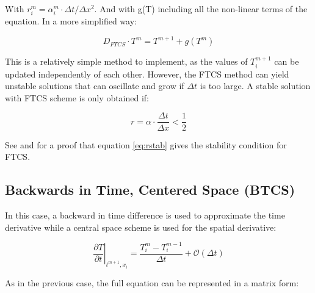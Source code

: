 With $r^m_i = \alpha^m_i \cdot \Delta t/ \Delta x^2$. And with g(T) including all the non-linear terms of the equation. In a more simplified way: 

\begin{equation}
    D_{FTCS}\cdot T^{m} = T^{m+1}+g(T^m)
\end{equation}

This is a relatively simple method to implement, as the values of $T_i^{m+1}$ can be updated independently of each other. However, the FTCS method can yield unstable solutions that can oscillate and grow if $\Delta t$ is too large. A stable solution with FTCS scheme is only obtained if: 

\begin{equation}
    r = \alpha\cdot \frac{\Delta t}{\Delta x} < \frac{1}{2}
    \label{eq:rstab}
\end{equation}

See \parencite[][]{ref:proveR1} and \parencite[][]{ref:proveR2} for a proof that equation \ref{eq:rstab} gives the stability condition for FTCS. 

\subsection{Backwards in Time, Centered Space (BTCS)}

In this case, a backward in time difference is used to approximate the time derivative while a central space scheme is used for the spatial derivative: 

\begin{equation}
    \left. \frac{\partial T}{\partial t} \right|_{t^{m+1},x_i} = \frac{T^m_i - T^{m-1}_i}{\Delta t}+\mathcal{O}(\Delta t)
\end{equation}

As in the previous case, the full equation can be represented in a matrix form: 


